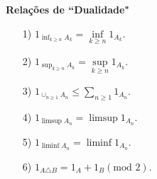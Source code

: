 \vspace*{1cm}
\textbf{Relações de ``Dualidade"}
\begin{enumerate}
\item[1)] $1_{\inf_{k\geqslant n} A_k} = \inf \limits_{k\geqslant n} 1_{A_k}$.
\item[2)] $1_{\sup_{k\geqslant n} A_k} = \sup \limits_{k\geqslant n} 1_{A_k}$.
\item[3)] $1_{\cup_{n\geqslant 1} A_n} \leqslant \sum \limits_{n \geqslant 1} 1_{A_n}$.
\item[4)] $1_{\limsup A_n} = \limsup 1_{A_n}$.
\item[5)] $1_{\liminf A_n} = \liminf 1_{A_n}$.
\item[6)] $ 1_{A \triangle B} = 1_A + 1_B (\text{mod 2})$.
\end{enumerate}
